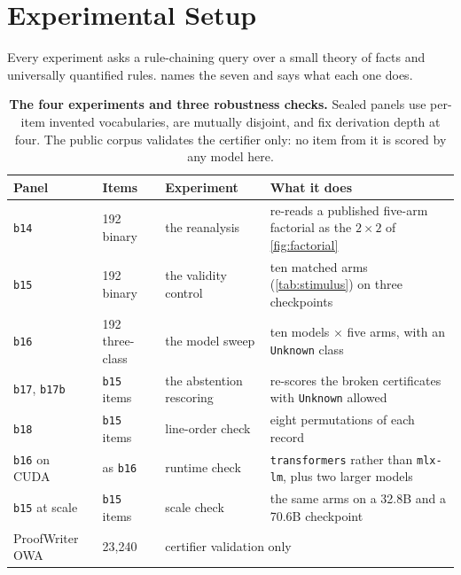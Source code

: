 \documentclass[10pt,twocolumn]{article}
\begin{document}
\section{Experimental Setup}

Every experiment asks a rule-chaining query over a small theory of facts and
universally quantified rules.  names the seven and says what each
one does.

\begin{table}[tb]
\centering\small
\caption{\textbf{The four experiments and three robustness checks.} Sealed panels
use per-item invented vocabularies, are mutually disjoint, and fix derivation
depth at four. The public corpus validates the certifier only: no item from it
is scored by any model here.}
\label{tab:panels}
\footnotesize
\begin{tabular}{@{}llll@{}}
\toprule
Panel & Items & Experiment & What it does \\
\midrule
\texttt{b14} & 192 binary & the reanalysis & re-reads a published five-arm factorial as the $2\times2$ of \cref{fig:factorial} \\
\texttt{b15} & 192 binary & the validity control & ten matched arms (\cref{tab:stimulus}) on three checkpoints \\
\texttt{b16} & 192 three-class & the model sweep & ten models $\times$ five arms, with an \texttt{Unknown} class \\
\texttt{b17}, \texttt{b17b} & \texttt{b15} items & the abstention rescoring & re-scores the broken certificates with \texttt{Unknown} allowed \\
\midrule
\texttt{b18} & \texttt{b15} items & line-order check & eight permutations of each record \\
\texttt{b16} on CUDA & as \texttt{b16} & runtime check & \texttt{transformers} rather than \texttt{mlx-lm}, plus two larger models \\
\texttt{b15} at scale & \texttt{b15} items & scale check & the same arms on a 32.8B and a 70.6B checkpoint \\
\midrule
ProofWriter OWA & 23{,}240 & \multicolumn{2}{l}{certifier validation only \citep{tafjord2020proofwriter}} \\
\bottomrule
\end{tabular}
\end{table}
\end{document}
